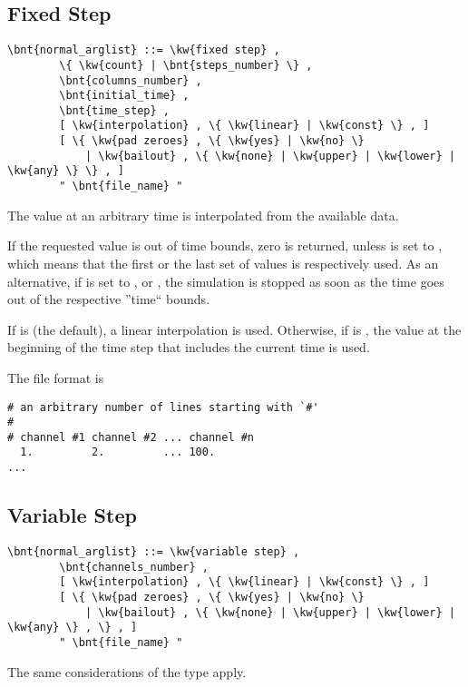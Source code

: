 \subsection{Fixed Step}
\begin{Verbatim}[commandchars=\\\{\}]
    \bnt{normal_arglist} ::= \kw{fixed step} , 
        \{ \kw{count} | \bnt{steps_number} \} ,
        \bnt{columns_number} ,
        \bnt{initial_time} ,
        \bnt{time_step} ,
        [ \kw{interpolation} , \{ \kw{linear} | \kw{const} \} , ]
        [ \{ \kw{pad zeroes} , \{ \kw{yes} | \kw{no} \}
            | \kw{bailout} , \{ \kw{none} | \kw{upper} | \kw{lower} | \kw{any} \} \} , ]
        " \bnt{file_name} "
\end{Verbatim}
The value at an arbitrary time is interpolated from the available data.

If the requested value is out of time bounds, zero is returned,
unless  is set to , which means that the first
or the last set of values is respectively used.
As an alternative, if  is set to , 
or , the simulation is stopped as soon as the time goes out
of the respective ''time`` bounds.

If  is  (the default), a linear interpolation
is used.
Otherwise, if  is , the value at the beginning
of the time step that includes the current time is used.

The file format is
\begin{verbatim}
# an arbitrary number of lines starting with `#'
#
# channel #1 channel #2 ... channel #n
  1.         2.         ... 100.
...
\end{verbatim}

\subsection{Variable Step}
\begin{Verbatim}[commandchars=\\\{\}]
    \bnt{normal_arglist} ::= \kw{variable step} , 
        \bnt{channels_number} ,
        [ \kw{interpolation} , \{ \kw{linear} | \kw{const} \} , ]
        [ \{ \kw{pad zeroes} , \{ \kw{yes} | \kw{no} \} 
            | \kw{bailout} , \{ \kw{none} | \kw{upper} | \kw{lower} | \kw{any} \} , \} , ]
        " \bnt{file_name} "
\end{Verbatim}
The same considerations of the  type apply.

